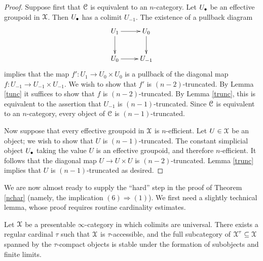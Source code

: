 \begin{proof}
Suppose first that $\operatorname{\mathcal{C}}$ is equivalent to an $n$-category. Let $U_{\bullet}$ be an effective groupoid in $\operatorname{\mathcal{X}}$. Then $U_{\bullet}$ has a colimit $U_{-1}$. The existence of a pullback diagram
$$ \xymatrix{ U_1 \ar[r] \ar[d] & U_0 \ar[d] \\
U_0 \ar[r] & U_{-1} }$$
implies that the map $f': U_{1} \rightarrow U_0 \times U_0$ is a pullback of the diagonal map
$f: U_{-1} \rightarrow U_{-1} \times U_{-1}$. We wish to show that $f'$ is $(n-2)$-truncated.
By Lemma \ref{tunc} it suffices to show that $f$ is $(n-2)$-truncated. By Lemma \ref{trunc}, this is equivalent to the assertion that $U_{-1}$ is $(n-1)$-truncated. Since $\operatorname{\mathcal{C}}$ is equivalent to an $n$-category, every object of $\operatorname{\mathcal{C}}$ is $(n-1)$-truncated.

Now suppose that every effective groupoid in $\operatorname{\mathcal{X}}$ is $n$-efficient. Let $U \in \operatorname{\mathcal{X}}$ be
an object; we wish to show that $U$ is $(n-1)$-truncated.
The constant simplicial object $U_{\bullet}$ taking the value $U$ is an effective groupoid, and therefore $n$-efficient. It follows that the diagonal map $U \rightarrow U \times U$ is $(n-2)$-truncated. Lemma \ref{trunc} implies that $U$ is $(n-1)$-truncated as desired.
\end{proof}

We are now almost ready to supply the ``hard'' step in the proof of Theorem \ref{nchar} (namely, the implication $(6) \Rightarrow (1)$). We first need a slightly technical lemma, whose proof requires routine cardinality estimates.

\begin{lemma}\label{nocake}
Let $\operatorname{\mathcal{X}}$ be a presentable $\infty$-category in which colimits are universal. There exists a regular cardinal $\tau$ such that $\operatorname{\mathcal{X}}$ is $\tau$-accessible, and the full subcategory of $\operatorname{\mathcal{X}}^{\tau} \subseteq \operatorname{\mathcal{X}}$ spanned by the $\tau$-compact objects is stable under the formation of subobjects and finite limits.
\end{lemma}

